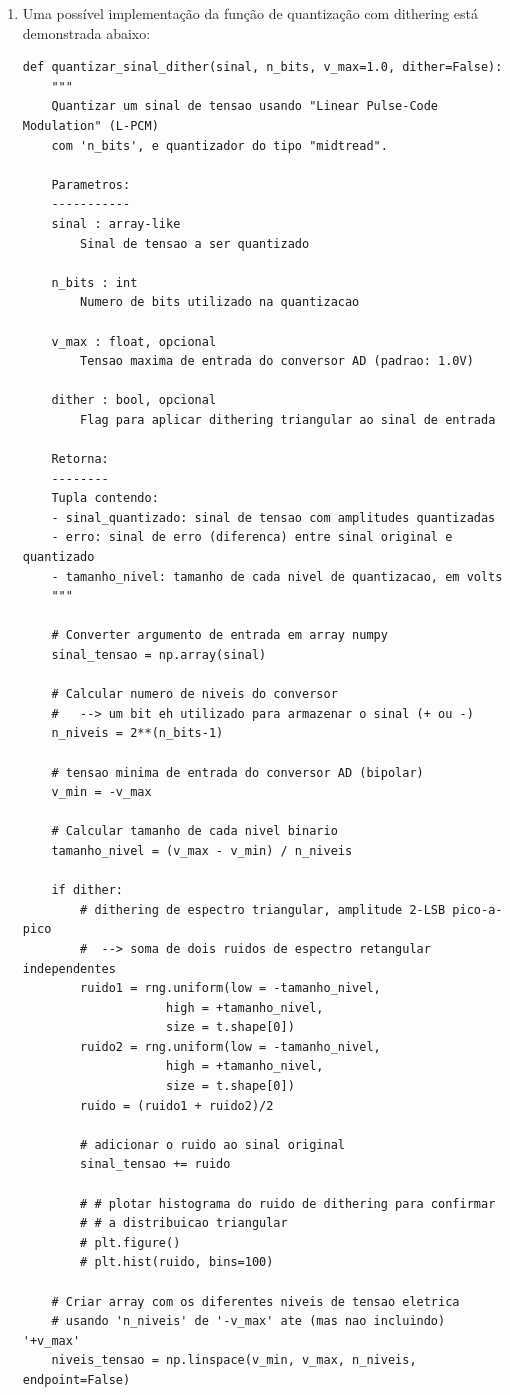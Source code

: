 \documentclass[a4paper,twoside,12pt]{article}
\begin{document}
		\begin{enumerate}
		\item Uma possível implementação da função de quantização com dithering está demonstrada abaixo:
		
\begin{lstlisting}[frame=single]	
def quantizar_sinal_dither(sinal, n_bits, v_max=1.0, dither=False):
	"""
	Quantizar um sinal de tensao usando "Linear Pulse-Code Modulation" (L-PCM)
	com 'n_bits', e quantizador do tipo "midtread".
	
	Parametros:
	-----------
	sinal : array-like
		Sinal de tensao a ser quantizado
	
	n_bits : int
		Numero de bits utilizado na quantizacao
	
	v_max : float, opcional
		Tensao maxima de entrada do conversor AD (padrao: 1.0V)
	
	dither : bool, opcional
		Flag para aplicar dithering triangular ao sinal de entrada
	
	Retorna:
	--------
	Tupla contendo:
	- sinal_quantizado: sinal de tensao com amplitudes quantizadas
	- erro: sinal de erro (diferenca) entre sinal original e quantizado
	- tamanho_nivel: tamanho de cada nivel de quantizacao, em volts
	"""
	
	# Converter argumento de entrada em array numpy
	sinal_tensao = np.array(sinal)
	
	# Calcular numero de niveis do conversor
	#   --> um bit eh utilizado para armazenar o sinal (+ ou -)
	n_niveis = 2**(n_bits-1)
	
	# tensao minima de entrada do conversor AD (bipolar)
	v_min = -v_max
	
	# Calcular tamanho de cada nivel binario
	tamanho_nivel = (v_max - v_min) / n_niveis
	
	if dither:
		# dithering de espectro triangular, amplitude 2-LSB pico-a-pico
		#  --> soma de dois ruidos de espectro retangular independentes
		ruido1 = rng.uniform(low = -tamanho_nivel,
					high = +tamanho_nivel,
					size = t.shape[0])
		ruido2 = rng.uniform(low = -tamanho_nivel,
					high = +tamanho_nivel,
					size = t.shape[0])
		ruido = (ruido1 + ruido2)/2
		
		# adicionar o ruido ao sinal original
		sinal_tensao += ruido
		
		# # plotar histograma do ruido de dithering para confirmar
		# # a distribuicao triangular
		# plt.figure()
		# plt.hist(ruido, bins=100)
	
	# Criar array com os diferentes niveis de tensao eletrica
	# usando 'n_niveis' de '-v_max' ate (mas nao incluindo) '+v_max'
	niveis_tensao = np.linspace(v_min, v_max, n_niveis, endpoint=False)
	

\end{lstlisting}
\end{enumerate}
\end{document}
